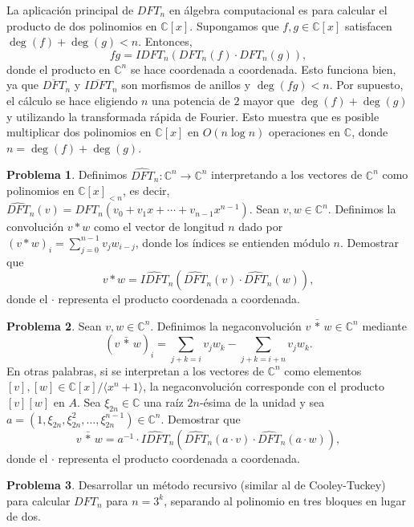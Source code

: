 \documentclass[a4paper, 11pt]{article}
\newcommand{\CC}{\mathbb{C}}
\newcounter{numerodetema}
\theoremstyle{plain}
\theoremstyle{definition}
\newtheorem{prob}{Problema}[numerodetema]
\begin{document}
\bigskip



\bigskip

La aplicación principal de $DFT_n$ en álgebra computacional
es para calcular el producto de dos polinomios en $\CC[x]$. Supongamos
que $f,g\in\CC[x]$ satisfacen $\deg(f)+\deg(g)<n$. Entonces,
\[
   fg = IDFT_n\left(
      DFT_n(f)\cdot DFT_n(g)
   \right),
\]
donde el producto en $\CC^n$ se hace coordenada a coordenada. Esto
funciona bien, ya que $\overline{DFT}_n$ y $\overline{IDFT}_n$ son
morfismos de anillos y $\deg(fg)<n$. Por supuesto, el cálculo se
hace eligiendo $n$ una potencia de $2$ mayor que $\deg(f)+\deg(g)$
y utilizando la transformada rápida de Fourier. Esto muestra que
es posible multiplicar dos polinomios en $\CC[x]$ en $O(n\log n)$
operaciones en $\CC$, donde $n=\deg(f)+\deg(g)$.

\begin{prob}
Definimos $\widehat{DFT}_n:\CC^n\to\CC^n$ interpretando a los vectores de $\CC^n$
como polinomios en $\CC[x]_{<n}$, es decir,
$\widehat{DFT}_n(v)=DFT_n(v_0+v_1x+\cdots+v_{n-1}x^{n-1})$.
Sean $v,w\in\CC^n$. Definimos la convolución $v\ast w$ como el vector de
longitud $n$ dado por $(v\ast w)_i = \sum_{j=0}^{n-1}v_jw_{i-j}$, donde
los índices se entienden módulo $n$. Demostrar que
\[v\ast w = \widehat{IDFT}_n(\widehat{DFT}_n(v)\cdot \widehat{DFT}_n(w)),\]
donde el $\cdot$ representa el producto coordenada a coordenada.
\end{prob}

\begin{prob}
Sean $v,w\in\CC^n$. Definimos la negaconvolución $v\,\bar{*}\,w\in\CC^n$ mediante
\[(v\,\bar{\ast}\,w)_i=\sum_{j+k=i}v_jw_k-\sum_{j+k=i+n}v_jw_k.\] En otras palabras,
si se interpretan a los vectores de $\CC^n$ como elementos
$[v],[w]\in\CC[x]/\langle x^n+1\rangle$, la negaconvolución corresponde
con el producto $[v][w]$ en $A$. Sea $\xi_{2n}\in\CC$ una raíz $2n$-ésima
de la unidad y sea $a=(1,\xi_{2n},\xi_{2n}^2,\ldots,\xi_{2n}^{n-1})\in\CC^n$.
Demostrar que
\[
   v\,\bar{\ast}\,w=a^{-1}\cdot \widehat{IDFT}_n(\widehat{DFT}_n(a\cdot v)
   \cdot \widehat{DFT}_n(a\cdot w)),
\]
donde el $\cdot$ representa el producto coordenada a coordenada.
\end{prob}

\begin{prob}
Desarrollar un método recursivo (similar al de Cooley-Tuckey) para calcular
$DFT_n$ para $n=3^k$, separando al polinomio en tres bloques en lugar de dos.
\end{prob}
\end{document}

